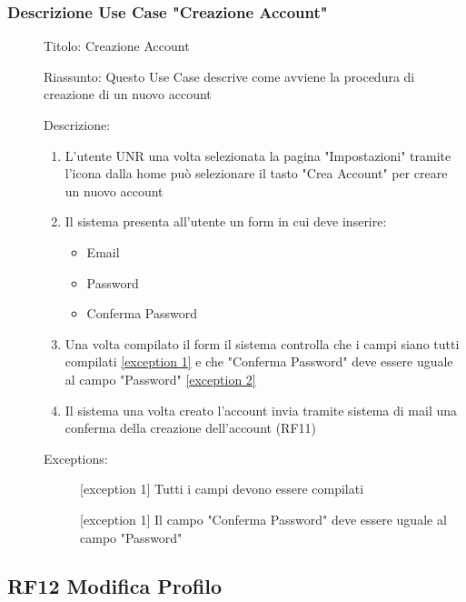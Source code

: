 \documentclass{article}
\begin{document}
\subsubsection*{Descrizione Use Case "Creazione Account"}
\begin{description}
    \item[] Titolo: Creazione Account
    \item[] Riassunto: Questo Use Case descrive come avviene la procedura di creazione di un nuovo account
    \item[] Descrizione:
        \begin{enumerate}
            \item L'utente UNR una volta selezionata la pagina "Impostazioni" tramite l'icona  dalla home può selezionare il tasto "Crea Account" per creare un nuovo account
            \item Il sistema presenta all'utente un form in cui deve inserire:
                  \begin{itemize}
                      \item Email
                      \item Password
                      \item Conferma Password
                  \end{itemize}
            \item Una volta compilato il form il sistema controlla che i campi siano tutti compilati \hyperref[exc:10.1]{[exception 1]} e che "Conferma Password" deve essere uguale al campo "Password" \hyperref[exc:10.2]{[exception 2]}
            \item Il sistema una volta creato l'account invia tramite sistema di mail una conferma della creazione dell'account (RF11)
        \end{enumerate}
    \item[] Exceptions:
        \begin{description}
            \item[] \label{exc:10.1} [exception 1] Tutti i campi devono essere compilati
            \item[] \label{exc:10.2} [exception 1] Il campo "Conferma Password" deve essere uguale al campo "Password"
        \end{description}
\end{description}
\clearpage
\subsection{RF12 Modifica Profilo}
\end{document}
